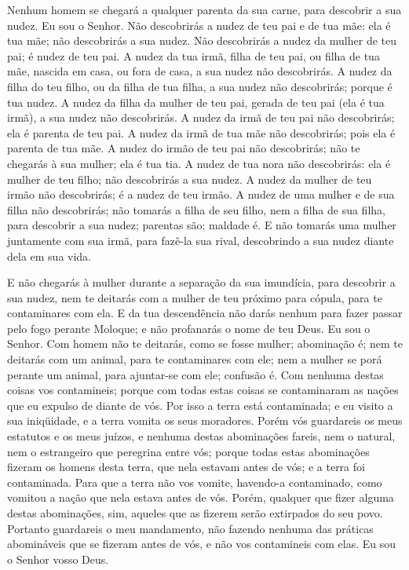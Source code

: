 Nenhum homem se chegará a qualquer parenta da sua carne, para
descobrir a sua nudez. Eu sou o Senhor. Não descobrirás a nudez
de teu pai e de tua mãe: ela é tua mãe; não descobrirás a sua nudez.
Não descobrirás a nudez da mulher de teu pai; é nudez de teu
pai. A nudez da tua irmã, filha de teu pai, ou filha de tua mãe,
nascida em casa, ou fora de casa, a sua nudez não descobrirás.
A nudez da filha do teu filho, ou da filha de tua filha, a
sua nudez não descobrirás; porque é tua nudez. A nudez da
filha da mulher de teu pai, gerada de teu pai (ela é tua irmã), a
sua nudez não descobrirás. A nudez da irmã de teu pai não
descobrirás; ela é parenta de teu pai. A nudez da irmã de tua
mãe não descobrirás; pois ela é parenta de tua mãe. A nudez
do irmão de teu pai não descobrirás; não te chegarás à sua mulher;
ela é tua tia. A nudez de tua nora não descobrirás: ela é
mulher de teu filho; não descobrirás a sua nudez. A nudez da
mulher de teu irmão não descobrirás; é a nudez de teu irmão.
A nudez de uma mulher e de sua filha não descobrirás; não
tomarás a filha de seu filho, nem a filha de sua filha, para
descobrir a sua nudez; parentas são; maldade é. E não tomarás
uma mulher juntamente com sua irmã, para fazê-la sua rival,
descobrindo a sua nudez diante dela em sua vida.

E não chegarás à mulher durante a separação da sua imundícia,
para descobrir a sua nudez, nem te deitarás com a mulher de
teu próximo para cópula, para te contaminares com ela. E da
tua descendência não darás nenhum para fazer passar pelo fogo
perante Moloque; e não profanarás o nome de teu Deus. Eu sou o
Senhor. Com homem não te deitarás, como se fosse mulher;
abominação é; nem te deitarás com um animal, para te
contaminares com ele; nem a mulher se porá perante um animal, para
ajuntar-se com ele; confusão é. Com nenhuma destas coisas vos
contamineis; porque com todas estas coisas se contaminaram as nações
que eu expulso de diante de vós. Por isso a terra está
contaminada; e eu visito a sua iniqüidade, e a terra vomita os seus
moradores. Porém vós guardareis os meus estatutos e os meus
juízos, e nenhuma destas abominações fareis, nem o natural, nem o
estrangeiro que peregrina entre vós; porque todas estas
abominações fizeram os homens desta terra, que nela estavam antes de
vós; e a terra foi contaminada. Para que a terra não vos
vomite, havendo-a contaminado, como vomitou a nação que nela estava
antes de vós. Porém, qualquer que fizer alguma destas
abominações, sim, aqueles que as fizerem serão extirpados do seu
povo. Portanto guardareis o meu mandamento, não fazendo
nenhuma das práticas abomináveis que se fizeram antes de vós, e não
vos contamineis com elas. Eu sou o Senhor vosso Deus.

